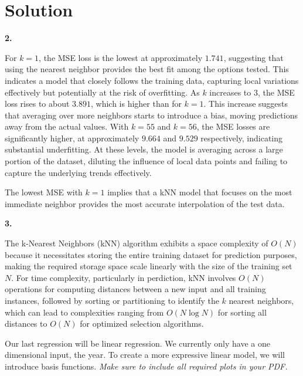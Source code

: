 \documentclass[submit]{harvardml}
\newenvironment{solution}
  {\color{blue}\section*{Solution}}
{}
\begin{document}
\begin{solution}
\bigskip
\textbf{2.}

For \(k = 1\), the MSE loss is the lowest at approximately \(1.741\), suggesting that using the nearest neighbor provides the best fit among the options tested. This indicates a model that closely follows the training data, capturing local variations effectively but potentially at the risk of overfitting. As \(k\) increases to 3, the MSE loss rises to about \(3.891\), which is higher than for \(k = 1\). This increase suggests that averaging over more neighbors starts to introduce a bias, moving predictions away from the actual values. With \(k = 55\) and \(k = 56\), the MSE losses are significantly higher, at approximately \(9.664\) and \(9.529\) respectively, indicating substantial underfitting. At these levels, the model is averaging across a large portion of the dataset, diluting the influence of local data points and failing to capture the underlying trends effectively.

The lowest MSE with \(k = 1\) implies that a kNN model that focuses on the most immediate neighbor provides the most accurate interpolation of the test data.

\bigskip
\textbf{3.}

The k-Nearest Neighbors (kNN) algorithm exhibits a space complexity of \(O(N)\) because it necessitates storing the entire training dataset for prediction purposes, making the required storage space scale linearly with the size of the training set \(N\). For time complexity, particularly in perdiction, kNN involves \(O(N)\) operations for computing distances between a new input and all training instances, followed by sorting or partitioning to identify the \(k\) nearest neighbors, which can lead to complexities ranging from \(O(N \log N)\) for sorting all distances to \(O(N)\) for optimized selection algorithms. 


\newpage
\begin{problem}

Our last regression will be linear regression.  We currently only have
a one dimensional input, the year.  To create a more expressive linear
model, we will introduce basis functions.
\vspace{1em}
\noindent\emph{Make sure to include all required plots in your PDF.}


\end{problem}
\end{solution}
\end{document}
